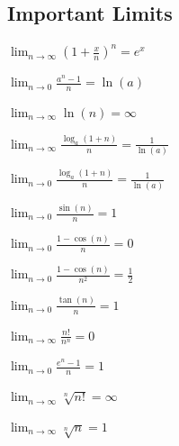\documentclass[8pt,a4paper]{extarticle}     %
\theoremstyle{definition}
\theoremstyle{definition}
\theoremstyle{definition}
\begin{document}
\begin{multicols}{4}
\subsection{Important Limits}
\begin{bulletlist}
	\item $\displaystyle\lim_{n \to \infty}\left(1 + \frac{x}{n}\right)^n = e^x$
	\item $\displaystyle\lim_{n \to 0} \frac{a^n-1}{n} = \ln(a)$
	\item $\displaystyle\lim_{n \to \infty} \ln(n) = \infty$
	\item $\displaystyle\lim_{n \to \infty} \frac{\log_{a}(1+n)}{n} = \frac{1}{\ln(a)}$			
	\item $\displaystyle\lim_{n \to 0} \frac{\log_{a}(1+n)}{n} = \frac{1}{\ln(a)}$
	\item $\displaystyle\lim_{n \to 0} \frac{\sin(n)}{n} = 1$
	\item $\displaystyle\lim_{n \to 0} \frac{1-\cos(n)}{n} = 0$
	\item $\displaystyle\lim_{n \to 0} \frac{1-\cos(n)}{n^2} = \frac{1}{2}$
	\item $\displaystyle\lim_{n \to 0} \frac{\tan(n)}{n} = 1$
	\item $\displaystyle\lim_{n \to \infty} \frac{n!}{n^n} = 0$
	\item $\displaystyle\lim_{n \to 0} \frac{e^n-1}{n} = 1$
	\item $\displaystyle\lim_{n \to \infty} \sqrt[n]{n!} = \infty$
	\item $\displaystyle\lim_{n \to \infty} \sqrt[n]{n} = 1$
\end{bulletlist}

\end{multicols}
\end{document}
